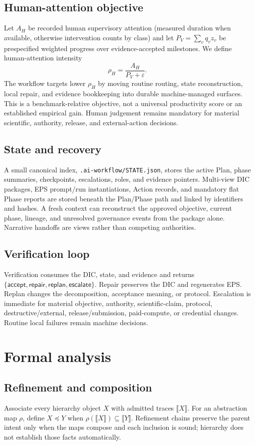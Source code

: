 \documentclass{article}
\begin{document}
\subsection{Human-attention objective}
Let $A_H$ be recorded human supervisory attention (measured duration when available, otherwise intervention counts by class) and let $P_V=\sum_v q_v z_v$ be prespecified weighted progress over evidence-accepted milestones. We define human-attention intensity
\[
\rho_H=\frac{A_H}{P_V+\varepsilon}.
\]
The workflow targets lower $\rho_H$ by moving routine routing, state reconstruction, local repair, and evidence bookkeeping into durable machine-managed surfaces. This is a benchmark-relative objective, not a universal productivity score or an established empirical gain. Human judgement remains mandatory for material scientific, authority, release, and external-action decisions.

\subsection{State and recovery}
A small canonical index, \texttt{.ai-workflow/STATE.json}, stores the active Plan, phase summaries, checkpoints, escalations, roles, and evidence pointers. Multi-view DIC packages, EPS prompt/run instantiations, Action records, and mandatory flat Phase reports are stored beneath the Plan/Phase path and linked by identifiers and hashes. A fresh context can reconstruct the approved objective, current phase, lineage, and unresolved governance events from the package alone. Narrative handoffs are views rather than competing authorities.

\subsection{Verification loop}
Verification consumes the DIC, state, and evidence and returns
$\{\mathsf{accept},\mathsf{repair},\mathsf{replan},\mathsf{escalate}\}$.
Repair preserves the DIC and regenerates EPS. Replan changes the decomposition, acceptance meaning, or protocol. Escalation is immediate for material objective, authority, scientific-claim, protocol, destructive/external, release/submission, paid-compute, or credential changes. Routine local failures remain machine decisions.

\section{Formal analysis}
\subsection{Refinement and composition}
Associate every hierarchy object $X$ with admitted traces $\llbracket X\rrbracket$. For an abstraction map $\rho$, define $X\preceq Y$ when $\rho(\llbracket X\rrbracket)\subseteq\llbracket Y\rrbracket$. Refinement chains preserve the parent intent only when the maps compose and each inclusion is sound; hierarchy does not establish those facts automatically.
\end{document}
